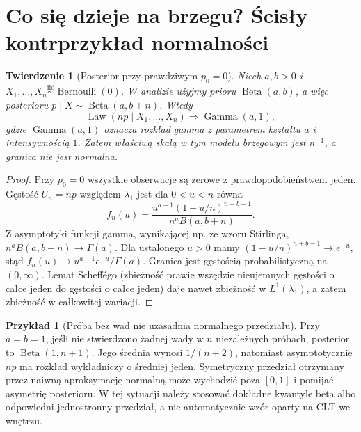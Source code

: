 \documentclass[11pt,a4paper,oneside]{report}
\numberwithin{equation}{chapter}
\theoremstyle{plain}
\newtheorem{twierdzenie}{Twierdzenie}[chapter]
\theoremstyle{definition}
\newtheorem{przyklad}{Przykład}[chapter]
\theoremstyle{remark}
\newcommand{\Law}{\operatorname{Law}}
\newcommand{\iid}{\mathrel{\overset{\mathrm{iid}}\sim}}
\begin{document}
\section{Co się dzieje na brzegu? Ścisły kontrprzykład normalności}
\begin{twierdzenie}[Posterior przy prawdziwym $p_0=0$]
\label{thm:boundary-beta-gamma}
Niech $a,b>0$ i $X_1,\ldots,X_n\iid\operatorname{Bernoulli}(0)$.
W analizie użyjmy prioru $\operatorname{Beta}(a,b)$,
a więc posterioru $p\mid X\sim\operatorname{Beta}(a,b+n)$.
Wtedy
\[
 \Law(np\mid X_1,\ldots,X_n)
 \Rightarrow\operatorname{Gamma}(a,1),
\]
gdzie $\operatorname{Gamma}(a,1)$ oznacza rozkład gamma
z parametrem kształtu $a$ i intensywnością $1$.
Zatem właściwą skalą w tym modelu brzegowym jest $n^{-1}$,
a granica nie jest normalna.
\end{twierdzenie}
\begin{proof}
Przy $p_0=0$ wszystkie obserwacje są zerowe z
prawdopodobieństwem jeden. Gęstość $U_n=np$ względem
$\lambda_1$ jest dla $0<u<n$ równa
\[
 f_n(u)=\frac{u^{a-1}(1-u/n)^{n+b-1}}{n^a B(a,b+n)}.
\]
Z asymptotyki funkcji gamma, wynikającej np. ze wzoru
Stirlinga, $n^a B(a,b+n)\to\Gamma(a)$.
Dla ustalonego $u>0$ mamy
$(1-u/n)^{n+b-1}\to e^{-u}$, stąd
$f_n(u)\to u^{a-1}e^{-u}/\Gamma(a)$.
Granica jest gęstością probabilistyczną na $(0,\infty)$.
Lemat Scheffégo (zbieżność prawie wszędzie nieujemnych
gęstości o całce jeden do gęstości o całce jeden)
daje nawet zbieżność w $L^1(\lambda_1)$, a zatem
zbieżność w całkowitej wariacji.
\end{proof}

\begin{przyklad}[Próba bez wad nie uzasadnia normalnego przedziału]
Przy $a=b=1$, jeśli nie stwierdzono żadnej wady
w $n$ niezależnych próbach, posterior to
$\operatorname{Beta}(1,n+1)$.
Jego średnia wynosi $1/(n+2)$, natomiast asymptotycznie
$n p$ ma rozkład wykładniczy o średniej jeden.
Symetryczny przedział otrzymany przez naiwną aproksymację
normalną może wychodzić poza $[0,1]$ i pomijać
asymetrię posterioru. W tej sytuacji należy stosować
dokładne kwantyle beta albo odpowiedni jednostronny
przedział, a nie automatycznie wzór oparty na CLT we wnętrzu.
\end{przyklad}
\end{document}
